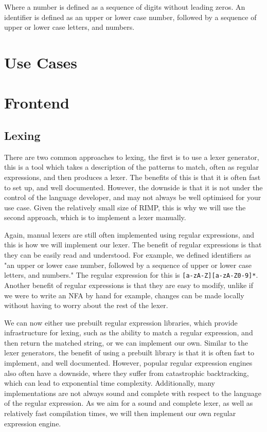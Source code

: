 Where a number is defined as a sequence of digits without leading zeros.
An identifier is defined as an upper or lower case number, followed by a sequence of upper or lower case letters, and numbers.

\section*{Use Cases}

\section*{Frontend}

\subsection*{Lexing}
There are two common approaches to lexing, the first is to use a lexer generator, this is a tool which takes a description of the patterns to match, often as regular expressions, and then produces a lexer.
The benefits of this is that it is often fast to set up, and well documented.
However, the downside is that it is not under the control of the language developer, and may not always be well optimised for your use case.
Given the relatively small size of RIMP, this is why we will use the second approach, which is to implement a lexer manually.

Again, manual lexers are still often implemented using regular expressions, and this is how we will implement our lexer.
The benefit of regular expressions is that they can be easily read and understood.
For example, we defined identifiers as "an upper or lower case number, followed by a sequence of upper or lower case letters, and numbers."
The regular expression for this is \lstinline{[a-zA-Z][a-zA-Z0-9]*}.
Another benefit of regular expressions is that they are easy to modify, unlike if we were to write an NFA by hand for example, changes can be made locally without having to worry about the rest of the lexer.

We can now either use prebuilt regular expression libraries, which provide infrastructure for lexing, such as the ability to match a regular expression, and then return the matched string, or we can implement our own.
Similar to the lexer generators, the benefit of using a prebuilt library is that it is often fast to implement, and well documented.
However, popular regular expression engines also often have a downside, where they suffer from catastrophic backtracking, which can lead to exponential time complexity.
Additionally, many implementations are not always sound and complete with respect to the language of the regular expression.
As we aim for a sound and complete lexer, as well as relatively fast compilation times, we will then implement our own regular expression engine.

